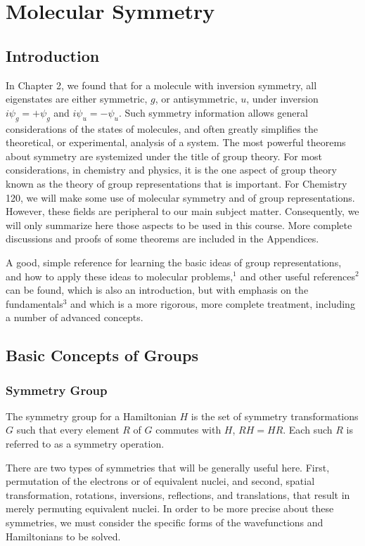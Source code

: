 \chapter{Molecular Symmetry}

\section{Introduction}
In Chapter 2, we found that for a molecule with inversion symmetry, 
all eigenstates are either symmetric, $g$, or antisymmetric, $u$, 
under inversion $i \psi_g = + \psi_g$ and $i \psi_u = - \psi_u$.  
Such symmetry information allows general considerations of the states 
of molecules, and often greatly simplifies the theoretical, or 
experimental, analysis of a system.  The most powerful theorems about 
symmetry are systemized under the title of group theory.  For most 
considerations, in chemistry and physics, it is the one aspect of 
group theory known as the theory of group representations that is 
important.  For Chemistry 120, we will make some use of molecular 
symmetry and of group representations.  However, these fields are 
peripheral to our main subject matter.  Consequently, we will only 
summarize here those aspects to be used in this course.  More complete 
discussions and proofs of some theorems are included in the Appendices.

A good, simple reference for learning the basic ideas of group 
representations, and how to apply these ideas to molecular 
problems,$^1$ and other useful references$^2$ can be found, which is 
also an introduction, but with emphasis on the fundamentals$^3$ and 
which is a more rigorous, more complete treatment, including a number 
of advanced concepts.

\section{Basic Concepts of Groups}

\subsection{Symmetry Group}

The symmetry group for a Hamiltonian $H$ is the set of symmetry 
transformations $G$ such that every element $R$ of $G$ commutes with 
$H$, $RH = HR$.  Each such $R$ is referred to as a symmetry operation.

There are two types of symmetries that will be generally useful 
here.  First, permutation of the electrons or of equivalent nuclei, and 
second, spatial transformation, rotations, inversions, reflections, 
and translations, that result in merely permuting equivalent nuclei.  
In order to be more precise about these symmetries, we must consider 
the  specific forms of the wavefunctions and Hamiltonians to be solved.

